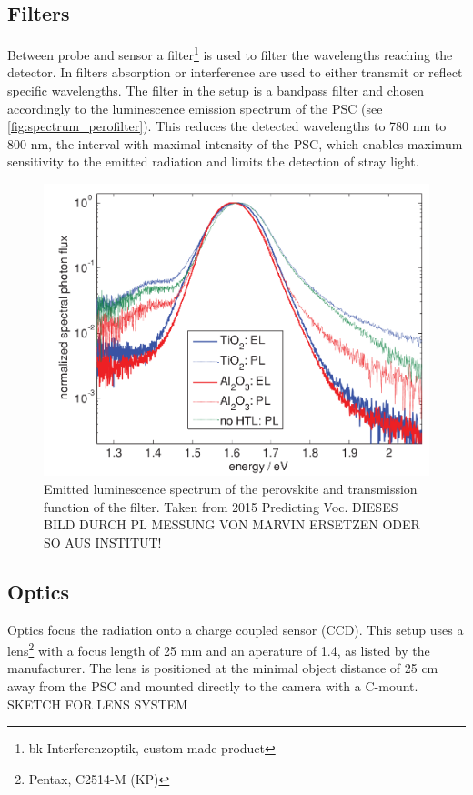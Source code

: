 \subsection{Filters}
Between probe and sensor a filter\footnote{bk-Interferenzoptik, custom made product} is used to filter the wavelengths reaching the detector. In filters absorption or interference are used to either transmit or reflect specific wavelengths. The filter in the setup is a bandpass filter and chosen accordingly to the luminescence emission spectrum of the PSC (see \autoref{fig:spectrum_perofilter}). This reduces the detected wavelengths to 780 nm to 800 nm, the interval with maximal intensity of the PSC, which enables maximum sensitivity to the emitted radiation and limits the detection of stray light. %

\begin{figure}[h]
	\centering
	\includegraphics[width=0.7\linewidth]{Images/ExperimentalSetup/Perovskite_Spectrum}
	\caption{Emitted luminescence spectrum of the perovskite and transmission function of the filter. Taken from 2015 Predicting Voc. DIESES BILD DURCH PL MESSUNG VON MARVIN ERSETZEN ODER SO AUS INSTITUT!}
	\label{fig:spectrum_perofilter}
\end{figure}
\subsection{Optics}
Optics focus the radiation onto a charge coupled sensor (CCD). This setup uses a lens\footnote{Pentax, C2514-M (KP)} with a focus length of 25 mm and an aperature of 1.4, as listed by the manufacturer. The lens is positioned at the minimal object distance of  25 cm away from the PSC and mounted directly to the camera with a C-mount.
\\
SKETCH FOR LENS SYSTEM
\\


